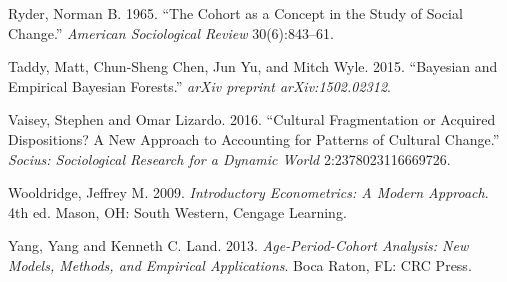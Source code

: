 \documentclass[]{article}
\begin{document}
Ryder, Norman B. 1965. ``The Cohort as a Concept in the Study of Social
Change.'' \emph{American Sociological Review} 30(6):843--61.

Taddy, Matt, Chun-Sheng Chen, Jun Yu, and Mitch Wyle. 2015. ``Bayesian
and Empirical Bayesian Forests.'' \emph{arXiv preprint
arXiv:1502.02312}.

Vaisey, Stephen and Omar Lizardo. 2016. ``Cultural Fragmentation or
Acquired Dispositions? A New Approach to Accounting for Patterns of
Cultural Change.'' \emph{Socius: Sociological Research for a Dynamic
World} 2:2378023116669726.

Wooldridge, Jeffrey M. 2009. \emph{Introductory Econometrics: A Modern
Approach}. 4th ed. Mason, OH: South Western, Cengage Learning.

Yang, Yang and Kenneth C. Land. 2013. \emph{Age-Period-Cohort Analysis:
New Models, Methods, and Empirical Applications}. Boca Raton, FL: CRC
Press.
\end{document}
